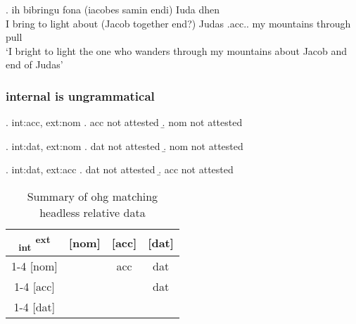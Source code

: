 \exg. ih bibringu fona (iacobes samin endi) Iuda dhen   \\
 I {bring to light}\scsub{[acc]} about (Jacob together end?) Judas .\ac{acc}.. my mountains {through pull}\scsub{[nom]}\\
 `I bright to light the one who wanders through my mountains about Jacob and end of Judas' \label{ex:ohg-acc-nom}












  \subsubsection{internal is ungrammatical}

  \ex. \ac{int}:\ac{acc}, \ac{ext}:\ac{nom}
  \a. \ac{acc} not attested
  \b. \ac{nom} not attested

 \ex. \ac{int}:\ac{dat}, \ac{ext}:\ac{nom}
 \a. \ac{dat} not attested
 \b. \ac{nom} not attested

 \ex. \ac{int}:\ac{dat}, \ac{ext}:\ac{acc}
 \a. \ac{dat} not attested
 \b. \ac{acc} not attested




 \begin{table}[H]
   \center
   \caption {Summary of \ac{ohg} matching headless relative data}
 		\begin{tabular}{c|c|c|c}
 		  \toprule
 			\textsubscript{\ac{int}} \textsuperscript{\ac{ext}}
 		        & [\ac{nom}]
 		        & [\ac{acc}]
 		        & [\ac{dat}]
 		        \\ \cmidrule{1-4}
 		    [\ac{nom}]
 		        &
 		        & \ac{acc}
 		        & \ac{dat}
 		        \\ \cmidrule{1-4}
 		    [\ac{acc}]
 		        &
 		        &
 		        & \ac{dat}
 		        \\ \cmidrule{1-4}
 		    [\ac{dat}]
 		        &
 		        &
 		        &
 		        \\
 		  \bottomrule
 		\end{tabular}
 \end{table}



